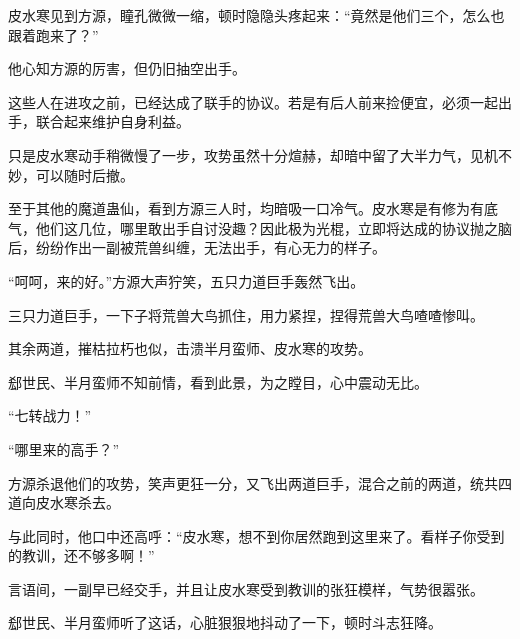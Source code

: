 \begin{this_body}
皮水寒见到方源，瞳孔微微一缩，顿时隐隐头疼起来：“竟然是他们三个，怎么也跟着跑来了？”

他心知方源的厉害，但仍旧抽空出手。

这些人在进攻之前，已经达成了联手的协议。若是有后人前来捡便宜，必须一起出手，联合起来维护自身利益。

只是皮水寒动手稍微慢了一步，攻势虽然十分煊赫，却暗中留了大半力气，见机不妙，可以随时后撤。

至于其他的魔道蛊仙，看到方源三人时，均暗吸一口冷气。皮水寒是有修为有底气，他们这几位，哪里敢出手自讨没趣？因此极为光棍，立即将达成的协议抛之脑后，纷纷作出一副被荒兽纠缠，无法出手，有心无力的样子。

“呵呵，来的好。”方源大声狞笑，五只力道巨手轰然飞出。

三只力道巨手，一下子将荒兽大鸟抓住，用力紧捏，捏得荒兽大鸟喳喳惨叫。

其余两道，摧枯拉朽也似，击溃半月蛮师、皮水寒的攻势。

郄世民、半月蛮师不知前情，看到此景，为之瞠目，心中震动无比。

“七转战力！”

“哪里来的高手？”

方源杀退他们的攻势，笑声更狂一分，又飞出两道巨手，混合之前的两道，统共四道向皮水寒杀去。

与此同时，他口中还高呼：“皮水寒，想不到你居然跑到这里来了。看样子你受到的教训，还不够多啊！”

言语间，一副早已经交手，并且让皮水寒受到教训的张狂模样，气势很嚣张。

郄世民、半月蛮师听了这话，心脏狠狠地抖动了一下，顿时斗志狂降。

\end{this_body}

